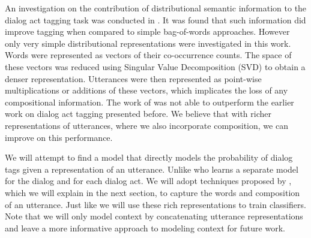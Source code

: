 An investigation on the contribution of distributional semantic information to the dialog act tagging task was conducted in . It was found that such information did improve tagging when compared to simple bag-of-words approaches. However only very simple distributional representations were investigated in this work. Words were represented as vectors of their co-occurrence counts. The space of these vectors was reduced using Singular Value Decomposition (SVD) to obtain a denser representation. Utterances were then represented as point-wise multiplications or additions of these vectors, which implicates the loss of any compositional information. The work of  was not able to outperform the earlier work on dialog act tagging presented before. We believe that with richer representations of utterances, where we also incorporate composition, we can improve on this performance.


We will attempt to find a model that directly models the probability of dialog tags given a representation of an utterance. Unlike  who learns a separate model for the dialog and for each dialog act. We will adopt techniques proposed by , which we will explain in the next section, to capture the words and composition of an utterance. Just like  we will use these rich representations to train classifiers. Note that we will only model context by concatenating utterance representations and leave a more informative approach to modeling context for future work.
